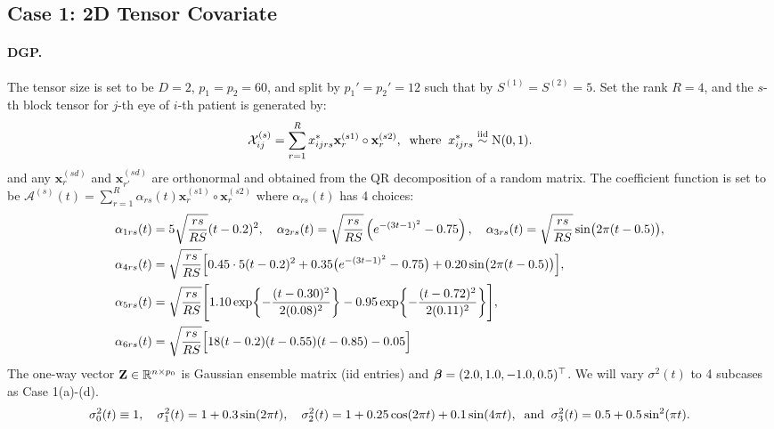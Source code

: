 \documentclass[10pt]{notes}
\begin{document}
\subsection*{Case 1: 2D Tensor Covariate}
\paragraph*{DGP.}
The tensor size is set to be $D=2$, $p_1=p_2=60$, and split by $p_1'=p_2'=12$ such that by $S^{(1)}=S^{(2)}=5$. Set the rank $R=4$, and the $s$-th block tensor for $j$-th eye of $i$-th patient is generated by:
\begin{align*}
    \mathcal{X}_{ij}^{(s)}=\sum_{r=1}^{R}x^*_{ijrs}\mathbf{x}_{r}^{(s1)}\circ\mathbf{x}_{r}^{(s2)},
    \;\;\text{where}\;\;
    x_{ijrs}^*\mathrel{\overset{\mathrm{iid}}{\sim}} \mathrm{N}(0,1).
\end{align*}
and any $\mathbf{x}_{r}^{(sd)}$ and $\mathbf{x}_{r'}^{(sd)}$ are orthonormal and obtained from the QR decomposition of a random matrix. The coefficient function is set to be $\mathcal{A}^{(s)}(t)=\sum_{r=1}^{R} \alpha_{rs}(t)\mathbf{x}_r^{(s1)}\circ \mathbf{x}_r^{(s2)}$ where $\alpha_{rs}(t)$ has 4 choices:
\begin{align*}
    &\alpha_{1rs}(t)=
    5\sqrt{\frac{rs}{RS}}(t-0.2)^2,\quad
    \alpha_{2rs}(t)=
    \sqrt{\frac{rs}{RS}}
    \left(e^{-(3t-1)^2}-0.75\right),\quad
    \alpha_{3rs}(t)=
    \sqrt{\frac{rs}{RS}}\sin\bigl(2\pi(t-0.5)\bigr),\\
    &\alpha_{4rs}(t)=
    \sqrt{\frac{rs}{RS}}
    \Bigl[
    0.45\cdot 5(t-0.2)^2
    +0.35\bigl(e^{-(3t-1)^2}-0.75\bigr)
    +0.20\sin\bigl(2\pi(t-0.5)\bigr)
    \Bigr],\\
    &\alpha_{5rs}(t)=
    \sqrt{\frac{rs}{RS}}
    \Biggl[
    1.10\exp\!\left\{-\frac{(t-0.30)^2}{2(0.08)^2}\right\}
    -0.95\exp\!\left\{-\frac{(t-0.72)^2}{2(0.11)^2}\right\}
    \Biggr],\\
    &\alpha_{6rs}(t)=
    \sqrt{\frac{rs}{RS}}
    \Bigl[
    18(t-0.2)(t-0.55)(t-0.85)-0.05
    \Bigr]
\end{align*}
The one-way vector $\mathbf{Z}\in\mathbb{R}^{n\times p_0}$ is Gaussian ensemble matrix (iid entries) and $\bm{\beta}=(2.0,1.0,-1.0,0.5)^\top$. We will vary $\sigma^2(t)$ to 4 subcases as Case 1(a)-(d).
\begin{align}
    \sigma^2_0(t)\equiv 1,\quad
    \sigma^2_1(t)=1+0.3\sin(2\pi t),\quad
    \sigma^2_2(t)=1+0.25\cos(2\pi t)+0.1 \sin(4\pi t),\;\;\text{and}\;\;
    \sigma^2_3(t)=0.5+0.5\sin^2(\pi t).
\end{align}
\end{document}
